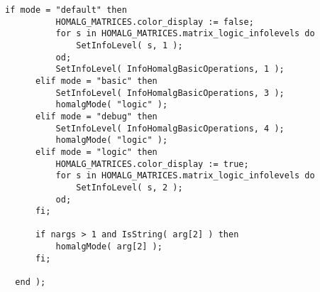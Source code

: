 \documentclass[a4paper,11pt]{report}
\begin{document}
{{{\begin{Verbatim}[fontsize=\small,frame=single,label=Code]
      if mode = "default" then
          HOMALG_MATRICES.color_display := false;
          for s in HOMALG_MATRICES.matrix_logic_infolevels do
              SetInfoLevel( s, 1 );
          od;
          SetInfoLevel( InfoHomalgBasicOperations, 1 );
      elif mode = "basic" then
          SetInfoLevel( InfoHomalgBasicOperations, 3 );
          homalgMode( "logic" );
      elif mode = "debug" then
          SetInfoLevel( InfoHomalgBasicOperations, 4 );
          homalgMode( "logic" );
      elif mode = "logic" then
          HOMALG_MATRICES.color_display := true;
          for s in HOMALG_MATRICES.matrix_logic_infolevels do
              SetInfoLevel( s, 2 );
          od;
      fi;
      
      if nargs > 1 and IsString( arg[2] ) then
          homalgMode( arg[2] );
      fi;
      
  end );
\end{Verbatim}
 }

 }

  }
\end{document}
